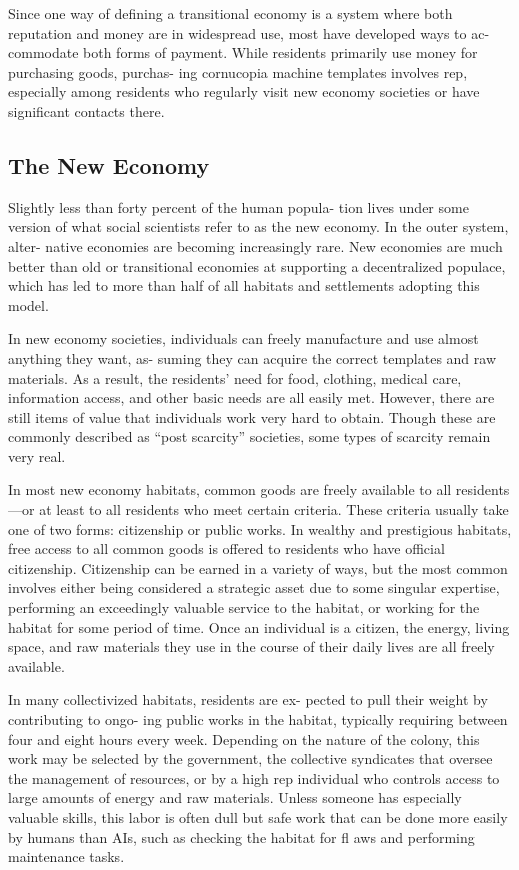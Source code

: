 Since one way of defining a transitional economy 
is a system where both reputation and money are 
in widespread use, most have developed ways to ac-
commodate both forms of payment. While residents 
primarily use money for purchasing goods, purchas-
ing cornucopia machine templates involves rep, 
especially among residents who regularly visit new 
economy societies or have significant contacts there.

\subsection{The New Economy}

Slightly less than forty percent of the human popula-
tion lives under some version of what social scientists 
refer to as the new economy. In the outer system, alter-
native economies are becoming increasingly rare. New 
economies are much better than old or transitional 
economies at supporting a decentralized populace, 
which has led to more than half of all habitats and 
settlements adopting this model.

In new economy societies, individuals can freely 
manufacture and use almost anything they want, as-
suming they can acquire the correct templates and 
raw materials. As a result, the residents' need for food, 
clothing, medical care, information access, and other 
basic needs are all easily met. However, there are still 
items of value that individuals work very hard to obtain. 
Though these are commonly described as ``post scarcity'' 
societies, some types of scarcity remain very real.

In most new economy habitats, common goods 
are freely available to all residents—or at least to 
all residents who meet certain criteria. These criteria 
usually take one of two forms: citizenship or public 
works. In wealthy and prestigious habitats, free access 
to all common goods is offered to residents who have 
official citizenship. Citizenship can be earned in a 
variety of ways, but the most common involves either 
being considered a strategic asset due to some singular 
expertise, performing an exceedingly valuable service 
to the habitat, or working for the habitat for some 
period of time. Once an individual is a citizen, the 
energy, living space, and raw materials they use in the 
course of their daily lives are all freely available.

In many collectivized habitats, residents are ex-
pected to pull their weight by contributing to ongo-
ing public works in the habitat, typically requiring 
between four and eight hours every week. Depending 
on the nature of the colony, this work may be selected 
by the government, the collective syndicates that 
oversee the management of resources, or by a high 
rep individual who controls access to large amounts 
of energy and raw materials. Unless someone has 
especially valuable skills, this labor is often dull but 
safe work that can be done more easily by humans 
than AIs, such as checking the habitat for fl aws and 
performing maintenance tasks.

